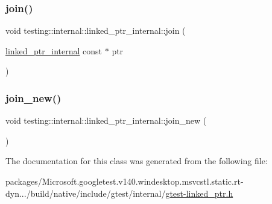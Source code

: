 \mbox{\label{classtesting_1_1internal_1_1linked__ptr__internal_acd5a341459f7e81b10b4112d8c764e2a}} 
\subsubsection{\texorpdfstring{join()}{join()}}
{\footnotesize\ttfamily void testing\+::internal\+::linked\+\_\+ptr\+\_\+internal\+::join (\begin{DoxyParamCaption}\item[{\mbox{\hyperlink{classtesting_1_1internal_1_1linked__ptr__internal}{linked\+\_\+ptr\+\_\+internal}} const $\ast$}]{ptr }\end{DoxyParamCaption})\hspace{0.3cm}{\ttfamily [inline]}}

\mbox{\label{classtesting_1_1internal_1_1linked__ptr__internal_a742af1f65df2d5e2b7198a1b74264a83}} 
\subsubsection{\texorpdfstring{join\_new()}{join\_new()}}
{\footnotesize\ttfamily void testing\+::internal\+::linked\+\_\+ptr\+\_\+internal\+::join\+\_\+new (\begin{DoxyParamCaption}{ }\end{DoxyParamCaption})\hspace{0.3cm}{\ttfamily [inline]}}



The documentation for this class was generated from the following file\+:\begin{DoxyCompactItemize}
\item 
packages/\+Microsoft.\+googletest.\+v140.\+windesktop.\+msvcstl.\+static.\+rt-\/dyn.../build/native/include/gtest/internal/\mbox{\hyperlink{gtest-linked__ptr_8h}{gtest-\/linked\+\_\+ptr.\+h}}\end{DoxyCompactItemize}
